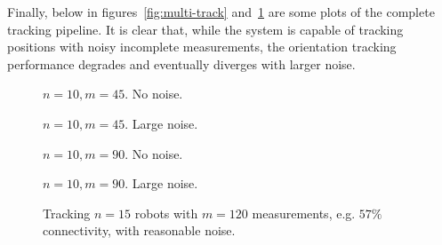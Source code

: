 Finally, below in figures~\ref{fig:multi-track} and~\ref{fig:single-track} are some plots of the complete tracking pipeline. It is clear that, while the system is capable of tracking positions with noisy incomplete measurements, the orientation tracking performance degrades and eventually diverges with larger noise. 
\begin{figure*}
    \begin{subfigure}{0.49\linewidth}
        
        \caption{$n=10, m=45$. No noise.}
    \end{subfigure}
    \hfill
    \begin{subfigure}{0.49\linewidth}
        
        \caption{$n=10, m=45$. Large noise.}
    \end{subfigure}
    \begin{subfigure}{0.49\linewidth}
        
        \caption{$n=10, m=90$. No noise.}
    \end{subfigure}
    \hfill
    \begin{subfigure}{0.49\linewidth}
        
        \caption{$n=10, m=90$. Large noise.}
    \end{subfigure}
    \caption{Sample tracking performance for $n=10$ robots with varying numbers of measurements and noise. Dashed line is ground truth, red line is estimated state.}
    \label{fig:multi-track}
\end{figure*}
\FloatBarrier
\begin{figure}[ht]
    \centering
    
    \caption{Tracking $n=15$ robots with $m=120$ measurements, e.g. $57\%$ connectivity, with reasonable noise.}
    \label{fig:single-track}
\end{figure}
